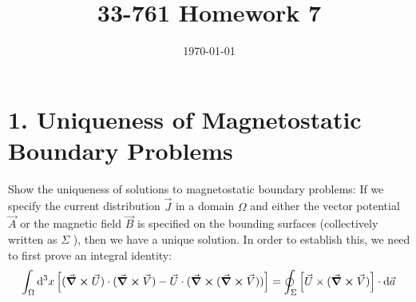 \documentclass[a4paper,twoside]{article}
\title{33-761 Homework 7}
\date{\today}
\begin{document}
\maketitle
\section*{1. Uniqueness of Magnetostatic Boundary Problems}
Show the uniqueness of solutions to magnetostatic boundary problems: If we specify the current distribution $ \vec{J} $ in a domain $ \Omega $ and either the vector potential $ \vec{A} $ or the magnetic field $ \vec{B} $ is specified on the bounding surfaces (collectively written as $ \Sigma $ ), then we have a unique solution. In order to establish this, we need to first prove an integral identity:
\begin{equation}
    \int_{\Omega} \dd[3]{x} \left[ (\curl{ \vec{U}}) \cdot (\curl{ \vec{V}}) - \vec{U} \cdot (\curl{( \curl{ \vec{V}})}) \right] = \oint_{\Sigma}\left[ \vec{U} \times (\curl{ \vec{V}}) \right] \cdot \dd{ \vec{a}}
\end{equation}
\end{document}
